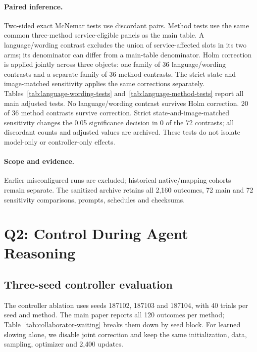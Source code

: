 

\paragraph{Paired inference.}
Two-sided exact McNemar tests use discordant pairs. Method tests use the same common three-method service-eligible panels as the main table. A language/wording contrast excludes the union of service-affected slots in its two arms; its denominator can differ from a main-table denominator. Holm correction is applied jointly across three objects: one family of 36 language/wording contrasts and a separate family of 36 method contrasts. The strict state-and-image-matched sensitivity applies the same corrections separately. Tables~\ref{tab:language-wording-tests} and~\ref{tab:language-method-tests} report all main adjusted tests. No language/wording contrast survives Holm correction. 20 of 36 method contrasts survive correction. Strict state-and-image-matched sensitivity changes the 0.05 significance decision in 0 of the 72 contrasts; all discordant counts and adjusted values are archived. These tests do not isolate model-only or controller-only effects.



\paragraph{Scope and evidence.}
 Earlier misconfigured runs are excluded; historical native/mapping cohorts remain separate. The sanitized archive retains all 2,160 outcomes, 72 main and 72 sensitivity comparisons, prompts, schedules and checksums.

\section{Q2: Control During Agent Reasoning}
\subsection{Three-seed controller evaluation}
\label{sec:collaborator-waiting}
The controller ablation uses seeds 187102, 187103 and 187104, with 40 trials per seed and method. The main paper reports all 120 outcomes per method; Table~\ref{tab:collaborator-waiting} breaks them down by seed block. For learned slowing alone, we disable joint correction and keep the same initialization, data, sampling, optimizer and 2,400 updates.

